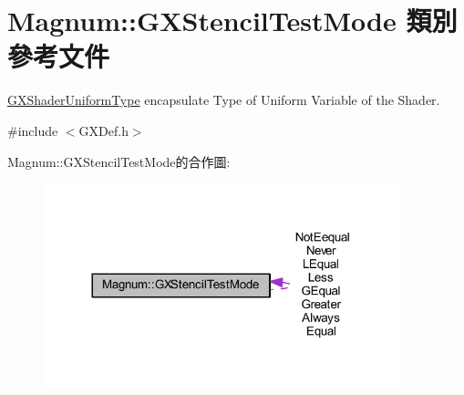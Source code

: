 \hypertarget{class_magnum_1_1_g_x_stencil_test_mode}{}\section{Magnum\+:\+:G\+X\+Stencil\+Test\+Mode 類別 參考文件}
\label{class_magnum_1_1_g_x_stencil_test_mode}


\hyperlink{class_magnum_1_1_g_x_shader_uniform_type}{G\+X\+Shader\+Uniform\+Type} encapsulate Type of Uniform Variable of the Shader.  




{\ttfamily \#include $<$G\+X\+Def.\+h$>$}



Magnum\+:\+:G\+X\+Stencil\+Test\+Mode的合作圖\+:\nopagebreak
\begin{figure}[H]
\begin{center}
\leavevmode
\includegraphics[width=293pt]{class_magnum_1_1_g_x_stencil_test_mode__coll__graph}
\end{center}
\end{figure}
